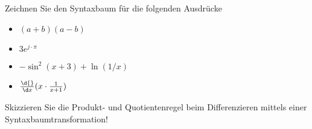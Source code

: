 \item Zeichnen Sie den Syntaxbaum für die folgenden Ausdrücke 

\begin{multicols}{2}
\begin{itemize}
\item $(a+b)(a-b)$
\item $3e^{j\cdot \pi}$
\item $-\sin^2(x+3)+\ln(1/x)$
\item $\frac{\d{}}{\d x} (x\cdot\frac{1}{x+1})$
\end{itemize}
\end{multicols}

Skizzieren Sie die Produkt- und Quotientenregel beim Differenzieren mittels einer Syntaxbaumtransformation!
